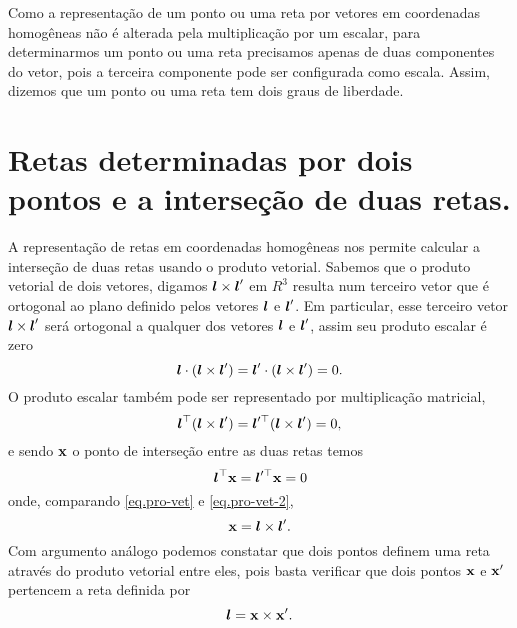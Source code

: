 Como a representação de um ponto ou uma reta por vetores em coordenadas homogêneas não é alterada pela multiplicação por um escalar,  para determinarmos um ponto ou uma reta precisamos apenas de duas componentes do vetor, pois a terceira componente pode ser configurada como escala. Assim, dizemos que um ponto ou uma reta tem dois graus de liberdade.
\section*{Retas determinadas por dois pontos e a interseção de duas retas.}

A representação de retas em coordenadas homogêneas nos permite calcular a interseção de duas retas usando o produto vetorial. Sabemos que o produto vetorial de dois vetores, digamos $\boldsymbol{l}\times\boldsymbol{l}'$ em $R^3$ resulta num terceiro vetor que é ortogonal ao plano definido pelos vetores $\boldsymbol{l}$ e $\boldsymbol{l}'$. Em particular, esse terceiro vetor $\boldsymbol{l}\times\boldsymbol{l}'$ será ortogonal a qualquer dos vetores $\boldsymbol{l}$ e $\boldsymbol{l}'$, assim seu produto escalar é zero
\begin{equation*}
\boldsymbol{l}\cdot(\boldsymbol{l}\times\boldsymbol{l}')=\boldsymbol{l}'\cdot(\boldsymbol{l}\times\boldsymbol{l}')=0.
\end{equation*}
O produto escalar também pode ser representado por multiplicação matricial,
\begin{equation}\label{eq.pro-vet}
\boldsymbol{l}^\top(\boldsymbol{l}\times\boldsymbol{l}')=\boldsymbol{l}'^\top(\boldsymbol{l}\times\boldsymbol{l}')=0,
\end{equation}
e sendo $\mathbf{x}$ o ponto de interseção entre as duas retas temos
\begin{equation}\label{eq.pro-vet-2}
\boldsymbol{l}^\top\mathbf{x}=\boldsymbol{l}'^\top\mathbf{x}=0
\end{equation}
onde, comparando \ref{eq.pro-vet} e \ref{eq.pro-vet-2},
\begin{equation*}
\mathbf{x}=\boldsymbol{l}\times\boldsymbol{l}'.
\end{equation*}
Com argumento análogo podemos constatar que dois pontos definem uma reta através do produto vetorial entre eles, pois basta verificar que dois pontos $\mathbf{x}$ e $\mathbf{x}'$ pertencem a reta definida por
\begin{equation*}
\boldsymbol{l}=\mathbf{x}\times\mathbf{x}'.
\end{equation*}\\


